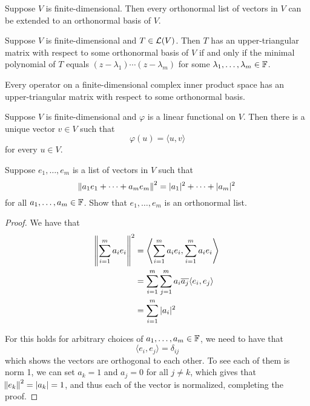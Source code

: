 \documentclass{extarticle}
\begin{document}
\begin{corollary}
    Suppose \(V\) is finite-dimensional. Then every orthonormal list of vectors in \(V\) can 
    be extended to an orthonormal basis of \(V\).
\end{corollary}

\begin{lemma}
    Suppose \(V\) is finite-dimensional and \(T \in \mathcal{L}(V)\). Then \(T\) has an upper-triangular matrix 
    with respect to some orthonormal basis of \(V\) if and only if the minimal polynomial of \(T\) equals 
    \((z - \lambda_1) \cdots (z - \lambda_m)\) for some \(\lambda_1, \ldots, \lambda_m \in \mathbb{F}\).
\end{lemma}

\begin{thm}
    Every operator on a finite-dimensional complex inner product space has an upper-triangular matrix 
    with respect to some orthonormal basis.
\end{thm}

\begin{thm}
    Suppose \(V\) is finite-dimensional and \(\varphi\) is a linear functional on \(V\). Then there 
    is a unique vector \(v \in V\) such that 
    \[\varphi(u) = \langle u,v \rangle\]
    for every \(u \in V\).
\end{thm}


\newpage 
{}

\begin{problem}{1}
    Suppose \(e_1, \ldots, e_m\) is a list of vectors in \(V\) such that 
    \[\norm{a_1 e_1 + \cdots + a_m e_m}^2 = |a_1|^2 + \cdots + |a_m|^2\]
    for all \(a_1, \ldots, a_m \in \mathbb{F}\). Show that \(e_1, \ldots, e_m\) is an orthonormal list.
\end{problem}

\begin{proof}
We have that 
\begin{align*}
    \norm{\sum_{i=1}^{m} a_i e_i}^2 
    &= \left\langle \sum_{i=1}^{m} a_i e_i , \sum_{i=1}^{m} a_i e_i \right\rangle    \\ 
    &= \sum_{i=1}^{m} \sum_{j=1}^{m} a_i \overline{a_j} \langle e_i, e_j \rangle  \\ 
    &= \sum_{i=1}^{m} |a_i|^2 
\end{align*}

For this holds for arbitrary choices of \(a_1, \ldots, a_m \in \mathbb{F}\), we need to have that 
\[\langle e_i,e_j \rangle = \delta_{ij}\]
which shows the vectors are orthogonal to each other. To see each of them is norm 1, we can 
set \(a_k = 1\) and \(a_j = 0\) for all \(j \neq k\), which gives that \(\norm{e_k}^2 = |a_k| = 1\), and 
thus each of the vector is normalized, completing the proof. 
\end{proof}
\end{document}

